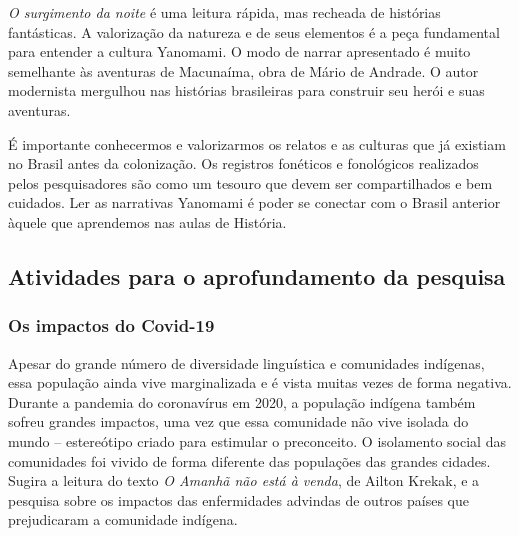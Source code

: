 \documentclass[12pt]{extarticle}
\begin{document}
\emph{O surgimento da noite} é uma leitura rápida, mas recheada de
histórias fantásticas. A valorização da natureza e de seus elementos é a
peça fundamental para entender a cultura Yanomami. O modo de narrar
apresentado é muito semelhante às aventuras de Macunaíma, obra de Mário
de Andrade. O autor modernista mergulhou nas histórias brasileiras para
construir seu herói e suas aventuras.

É importante conhecermos e valorizarmos os relatos e as culturas que já
existiam no Brasil antes da colonização. Os registros fonéticos e
fonológicos realizados pelos pesquisadores são como um tesouro que devem
ser compartilhados e bem cuidados. Ler as narrativas Yanomami é poder
se conectar com o Brasil anterior àquele que aprendemos nas aulas de
História.


\subsection{Atividades para o aprofundamento da pesquisa}



\subsubsection{Os impactos do Covid-19}


  Apesar do grande número de diversidade linguística e comunidades
  indígenas, essa população ainda vive marginalizada e é vista muitas
  vezes de forma negativa. Durante a pandemia do coronavírus em 2020, a
  população indígena também sofreu grandes impactos, uma vez que essa
  comunidade não vive isolada do mundo -- estereótipo criado para
  estimular o preconceito. O isolamento social das comunidades foi
  vivido de forma diferente das populações das grandes cidades. Sugira a
  leitura do texto \emph{O Amanhã não está à venda}, de Ailton Krekak, e a
  pesquisa sobre os impactos das enfermidades advindas de outros países
  que prejudicaram a comunidade indígena.
\end{document}
